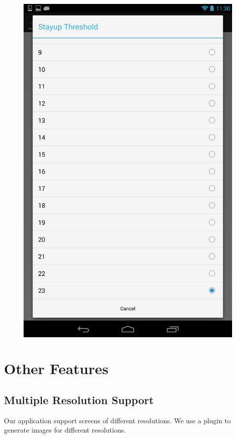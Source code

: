\documentclass[14pt]{extreport}
\begin{document}
\begin{figure}[h]
\begin{center}
\includegraphics[width=5in]{preference_stayuplate_threshold}
\end{center}
\end{figure}

\chapter{Other Features}
\section{Multiple Resolution Support}
Our application support screens of different resolutions. We use a plugin to generate images for different resolutions. 
\end{document}
